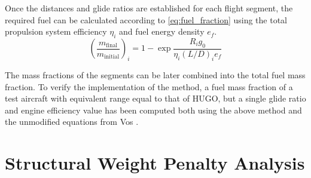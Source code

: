 Once the distances and glide ratios are established for each flight segment, the required fuel can be calculated according to \autoref{eq:fuel_fraction} \cite{Vos} using the total propulsion system efficiency $\eta_i$ and fuel energy density $e_f$.
\begin{equation}
\label{eq:fuel_fraction}
    \left(\frac{m_\text{final}}{m_\text{initial}}\right)_i = 1-\exp\frac{R_ig_0}{\eta_i (L/D)_i e_f}
\end{equation}

The mass fractions of the segments can be later combined into the total fuel mass fraction. To verify the implementation of the method, a fuel mass fraction of a test aircraft with equivalent range equal to that of HUGO, but a single glide ratio and engine efficiency value has been computed both using the above method and the unmodified equations from Vos \cite{Vos}.

\section{Structural Weight Penalty Analysis}
\label{sec:structural_weight_penalty_analysis}


